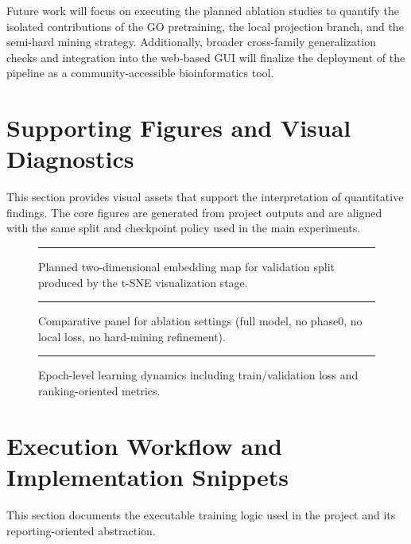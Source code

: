 \documentclass[unnumsec,webpdf,contemporary,large]{oup-authoring-template}%
\theoremstyle{thmstyleone}%
\theoremstyle{thmstyletwo}%
\theoremstyle{thmstylethree}%
\begin{document}
Future work will focus on executing the planned ablation studies to quantify the isolated contributions of the GO pretraining, the local projection branch, and the semi-hard mining strategy. Additionally, broader cross-family generalization checks and integration into the web-based GUI will finalize the deployment of the pipeline as a community-accessible bioinformatics tool.


\section{Supporting Figures and Visual Diagnostics}\label{sec6}

This section provides visual assets that support the interpretation of quantitative findings. The core figures are generated from project outputs and are aligned with the same split and checkpoint policy used in the main experiments.


\begin{figure}[!t]%
\centering
{\color{black!20}\rule{213pt}{37pt}}
\caption{Planned two-dimensional embedding map for validation split produced by the t-SNE visualization stage.}\label{fig1}
%
\end{figure}

\begin{figure}[!t]%
\centering
{\color{black!20}\rule{\textwidth}{74pt}}
\caption{Comparative panel for ablation settings (full model, no phase0, no local loss, no hard-mining refinement).}\label{fig2}
\end{figure}

\begin{figure}%
\centering
{\color{black!20}\rule{\hsize}{102pt}}
\caption{Epoch-level learning dynamics including train/validation loss and ranking-oriented metrics.}\label{fig3}
\end{figure}


\section{Execution Workflow and Implementation Snippets}\label{sec7}

This section documents the executable training logic used in the project and its reporting-oriented abstraction.
\end{document}
